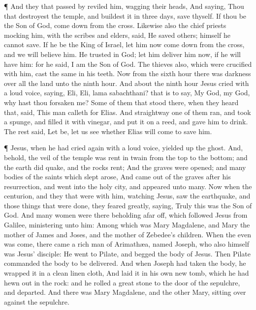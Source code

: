  ¶ And they that passed by reviled him, wagging their
heads,  And saying, Thou that destroyest the temple, and
buildest it in three days, save thyself. If thou be the Son of God, come
down from the cross.  Likewise also the chief priests
mocking him, with the scribes and elders, said,  He saved
others; himself he cannot save. If he be the King of Israel, let him now
come down from the cross, and we will believe him.  He
trusted in God; let him deliver him now, if he will have him: for he
said, I am the Son of God.  The thieves also, which were
crucified with him, cast the same in his teeth.  Now from
the sixth hour there was darkness over all the land unto the ninth hour.
 And about the ninth hour Jesus cried with a loud voice,
saying, Eli, Eli, lama sabachthani? that is to say, My God, my God, why
hast thou forsaken me?  Some of them that stood there, when
they heard that, said, This man calleth for Elias.  And
straightway one of them ran, and took a spunge, and filled it with
vinegar, and put it on a reed, and gave him to drink.  The
rest said, Let be, let us see whether Elias will come to save him.

 ¶ Jesus, when he had cried again with a loud voice,
yielded up the ghost.  And, behold, the veil of the temple
was rent in twain from the top to the bottom; and the earth did quake,
and the rocks rent;  And the graves were opened; and many
bodies of the saints which slept arose,  And came out of
the graves after his resurrection, and went into the holy city, and
appeared unto many.  Now when the centurion, and they that
were with him, watching Jesus, saw the earthquake, and those things that
were done, they feared greatly, saying, Truly this was the Son of God.
 And many women were there beholding afar off, which
followed Jesus from Galilee, ministering unto him:  Among
which was Mary Magdalene, and Mary the mother of James and Joses, and
the mother of Zebedee's children.  When the even was come,
there came a rich man of Arimathæa, named Joseph, who also himself was
Jesus' disciple:  He went to Pilate, and begged the body of
Jesus. Then Pilate commanded the body to be delivered.  And
when Joseph had taken the body, he wrapped it in a clean linen cloth,
 And laid it in his own new tomb, which he had hewn out in
the rock: and he rolled a great stone to the door of the sepulchre, and
departed.  And there was Mary Magdalene, and the other
Mary, sitting over against the sepulchre.

